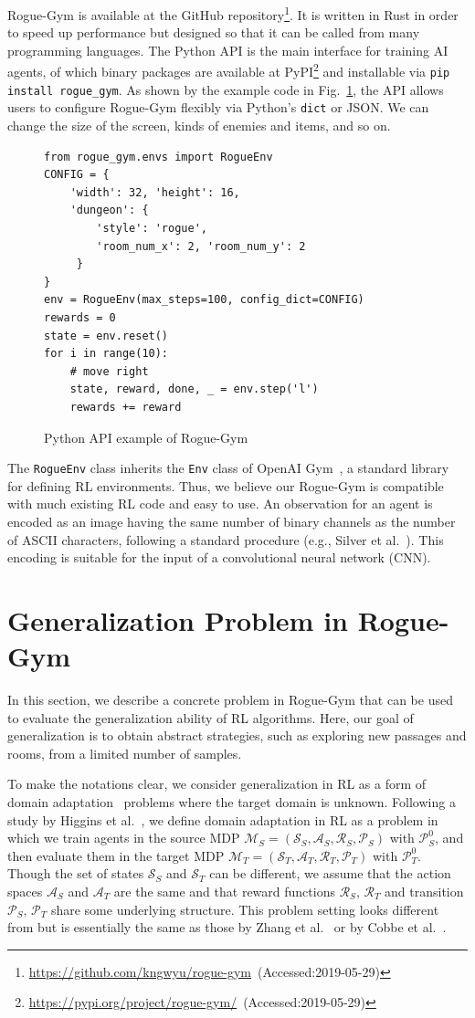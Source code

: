 \documentclass[conference]{IEEEtran}
\newcommand\hig{Higgins et al.~\cite{DARLA}}
\newcommand\zhang{Zhang et al.~\cite{Zhang1804}}
\newcommand\cobbe{Cobbe et al.~\cite{Coinrun}}
\newcommand\MDP[1]{
$\mathcal{M}_#1=(\mathcal{S}_#1,\mathcal{A}_#1,\mathcal{R}_#1,\mathcal{P}_#1)$%
}
\newcommand\footurl[1]{\footnote{\url{#1}~(Accessed:2019-05-29)}}
\begin{document}
Rogue-Gym is available at the GitHub
repository\footurl{https://github.com/kngwyu/rogue-gym}.
It is written in Rust in order to speed up performance but designed so
that it can be called from many programming languages.
The Python API is the main interface for training AI agents, of which 
binary packages are available at
PyPI\footurl{https://pypi.org/project/rogue-gym/} and installable via
\texttt{pip install rogue\_gym}.
As shown by the example code in Fig.~\ref{api}, the API allows users to
configure Rogue-Gym flexibly via Python's \texttt{dict} or JSON. We can
change the size of the screen, kinds of enemies and items, and so on.
\begin{figure}[t]\small
 \begin{verbatim}
from rogue_gym.envs import RogueEnv
CONFIG = {
    'width': 32, 'height': 16,
    'dungeon': {
        'style': 'rogue',
        'room_num_x': 2, 'room_num_y': 2
     }
}
env = RogueEnv(max_steps=100, config_dict=CONFIG)
rewards = 0
state = env.reset()
for i in range(10): 
    # move right
    state, reward, done, _ = env.step('l')
    rewards += reward
 \end{verbatim}
 \caption{Python API example of Rogue-Gym} \label{api}
\end{figure}
The \texttt{RogueEnv} class inherits the \texttt{Env} class of OpenAI
Gym~\cite{gym}, a standard library for defining RL environments. 
Thus, we believe our Rogue-Gym is compatible with much existing RL code
and easy to use.
An observation for an agent is encoded as an image having the same
number of binary channels as the number of ASCII characters, following a
standard procedure (e.g., Silver et al.~\cite{AlphaGo}).
This encoding is suitable for the input of a convolutional neural
network (CNN).

\section{Generalization Problem in Rogue-Gym} \label{section:problem-setting}
In this section, we describe a concrete problem in Rogue-Gym that can
be used to evaluate the generalization ability of RL algorithms.
Here, our goal of generalization is to obtain abstract strategies, such
as exploring new passages and rooms, from a limited number of samples.

To make the notations clear, we consider generalization in RL as a form
of domain adaptation~\cite{GlorotBB11} problems where the target domain
is unknown.
Following a study by \hig{}, we define domain adaptation in RL as
a problem in which we train agents in the source MDP\MDP{S} with
$\mathcal{P}^0_S$, and then evaluate them in the target MDP\MDP{T} with
$\mathcal{P}^0_T$. Though the set of states $\mathcal S_{S}$ and
$\mathcal S_{T}$ can be different, we assume that the action spaces
$\mathcal A_{S}$ and $\mathcal A_{T}$ are the same and that reward
functions $\mathcal R_{S},\, \mathcal R_{T}$ and transition
$\mathcal P_{S},\, \mathcal P_{T}$ share some underlying structure.
This problem setting looks different from but is essentially the same as
those by \zhang{} or by \cobbe{}. \par
\end{document}
